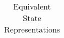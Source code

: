 \begin{table}[htbp!]
\begin{tabular}{|p{1.0 in} |p{5.0 in} |}
         \hline
\end{tabular}
   \label{Table: TD-1}
   \caption{Equivalent State Representations}
\end{table} 